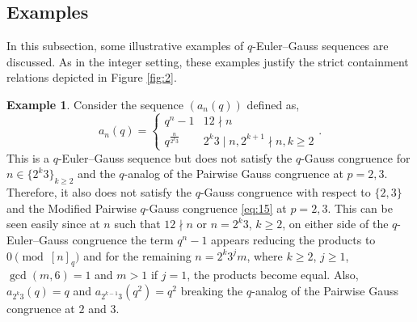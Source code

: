 \documentclass{article}
\numberwithin{equation}{section}
\theoremstyle{definition}
\newtheorem{example}[definition]{\bf {Example}}
\begin{document}
\subsection{Examples}
In this subsection, some illustrative examples of $q$-Euler--Gauss sequences are discussed. As in the integer setting, these examples justify the strict containment relations depicted in Figure \ref{fig:2}.
\begin{example}
    Consider the sequence $(a_n(q))$ defined as,
\[a_n(q)=
    \begin{cases}
        q^n-1&12\nmid n\\
        q^\frac{n}{2^k3}&2^k3\mid n, 2^{k+1}\nmid n, k\geq2
    \end{cases}\text{.}\]    
This is a $q$-Euler--Gauss sequence but does not satisfy the $q$-Gauss congruence for $n\in\{2^k3\}_{k\geq2}$ and the $q$-analog of the Pairwise Gauss congruence at $p=2,3$. Therefore, it also does not satisfy the $q$-Gauss congruence with respect to $\{2,3\}$ and the Modified Pairwise $q$-Gauss congruence \eqref{eq:15} at $p=2,3$. This can be seen easily since at $n$ such that $12\nmid n$ or $n=2^k3$, $k\geq2$, on either side of the $q$-Euler--Gauss congruence the term $q^n-1$ appears reducing the products to $0\pmod{[n]_q}$ and for the remaining $n=2^k3^jm$, where $k\geq2$, $j\geq1$, $\gcd(m,6)=1$ and $m>1$ if $j=1$, the products become equal. Also, $a_{2^k3}(q)=q$ and $a_{2^{k-1}3}(q^2)=q^2$ breaking the $q$-analog of the Pairwise Gauss congruence at $2$ and $3$.
\end{example}
\end{document}
